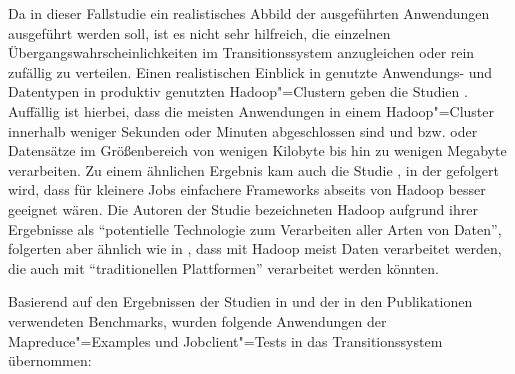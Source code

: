 Da in dieser Fallstudie ein realistisches Abbild der ausgeführten Anwendungen ausgeführt werden soll, ist es nicht sehr hilfreich, die einzelnen Übergangswahrscheinlichkeiten im Transitionssystem anzugleichen oder rein zufällig zu verteilen.
Einen realistischen Einblick in genutzte Anwendungs- und Datentypen in produktiv genutzten Hadoop"=Clustern geben \uA die Studien \cite{Chen2012,HadoopDataTypes}.
Auffällig ist hierbei, dass die meisten Anwendungen in einem Hadoop"=Cluster innerhalb weniger Sekunden oder Minuten abgeschlossen sind und bzw. oder Datensätze im Größenbereich von wenigen Kilobyte bis hin zu wenigen Megabyte verarbeiten.
Zu einem ähnlichen Ergebnis kam auch die Studie \cite{Ren2013}, in der gefolgert wird, dass für kleinere Jobs einfachere Frameworks abseits von Hadoop besser geeignet wären.
Die Autoren der Studie \cite{HadoopDataTypes} bezeichneten Hadoop aufgrund ihrer Ergebnisse als \enquote{potentielle Technologie zum Verarbeiten aller Arten von Daten}, folgerten aber ähnlich wie \citeauthor{Ren2013} in \cite{Ren2013}, dass mit Hadoop meist Daten verarbeitet werden, die auch mit \enquote{traditionellen Plattformen} verarbeitet werden könnten.

Basierend auf den Ergebnissen der Studien in \cite{Huang2010,Chen2012,HadoopDataTypes,Ren2013} und der in den Publikationen \cite{Shvachko2010,Dean2004,Graves2013} verwendeten Benchmarks, wurden folgende Anwendungen der Mapreduce"=Examples und Jobclient"=Tests in das Transitionssystem übernommen:

